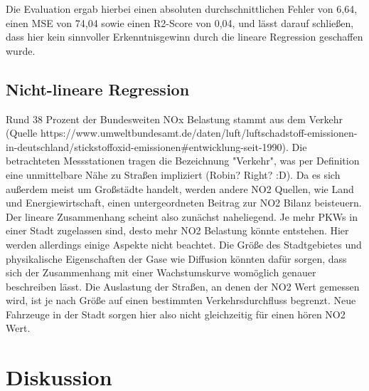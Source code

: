 \documentclass[11pt,a4paper,oneside,german]{article}
\begin{document}
	Die Evaluation ergab hierbei einen absoluten durchschnittlichen Fehler von 6,64, einen MSE von 74,04 sowie einen R2-Score von 0,04, und lässt darauf schließen, dass hier kein sinnvoller Erkenntnisgewinn durch die lineare Regression geschaffen wurde.
	
	\subsection{Nicht-lineare Regression}
	
	Rund 38 Prozent der Bundesweiten NOx Belastung stammt aus dem Verkehr (Quelle https://www.umweltbundesamt.de/daten/luft/luftschadstoff-emissionen-in-deutschland/stickstoffoxid-emissionen\#entwicklung-seit-1990). Die betrachteten Messstationen tragen die Bezeichnung "Verkehr", was per Definition eine unmittelbare Nähe zu Straßen impliziert (Robin? Right? :D). Da es sich außerdem meist um Großstädte handelt, werden andere NO2 Quellen, wie Land und Energiewirtschaft, einen untergeordneten Beitrag zur NO2 Bilanz beisteuern. Der lineare Zusammenhang scheint also zunächst naheliegend. Je mehr PKWs in einer Stadt zugelassen sind, desto mehr NO2 Belastung könnte entstehen. Hier werden allerdings einige Aspekte nicht beachtet. Die Größe des Stadtgebietes und physikalische Eigenschaften der Gase wie Diffusion könnten dafür sorgen, dass sich der Zusammenhang mit einer Wachstumskurve womöglich genauer beschreiben lässt. Die Auslastung der Straßen, an denen der NO2 Wert gemessen wird, ist je nach Größe auf einen bestimmten Verkehrsdurchfluss begrenzt. Neue Fahrzeuge in der Stadt sorgen hier also nicht gleichzeitig für einen hören NO2 Wert.     
	
	\section{Diskussion}
	
\end{document}
